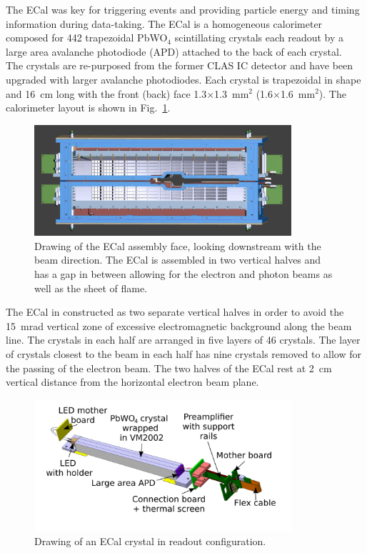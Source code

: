 The ECal was key for triggering events and providing particle energy and timing information during data-taking. The ECal is a homogeneous calorimeter composed for 442 trapezoidal PbWO$_4$ scintillating crystals each readout by a large area avalanche photodiode (APD) attached to the back of each crystal.~\cite{Balossino201789} The crystals are re-purposed from the former CLAS IC detector and have been upgraded with larger avalanche photodiodes. Each crystal is trapezoidal in shape and 16~cm long with the front (back) face 1.3$\times$1.3~mm$^2$ (1.6$\times$1.6~mm$^2$). The calorimeter layout is shown in Fig.~\ref{Figure:ecalface}. 

\begin{figure}[thb]
  \centering
      \includegraphics[width=0.85\textwidth]{pics/experiment/ecalface.png}
  \caption[Drawing of the ECal assembly face]{Drawing of the ECal assembly face, looking downstream with the beam direction. The ECal is assembled in two vertical halves and has a gap in between allowing for the electron and photon beams as well as the sheet of flame.}
  \label{Figure:ecalface}
\end{figure}

The ECal in constructed as two separate vertical halves in order to avoid the 15~mrad vertical zone of excessive electromagnetic background along the beam line. The crystals in each half are arranged in five layers of 46 crystals. The layer of crystals closest to the beam in each half has nine crystals removed to allow for the passing of the electron beam. The two halves of the ECal rest at 2~cm vertical distance from the  horizontal electron beam plane.

\begin{figure}[thb]
  \centering
      \includegraphics[width=0.85\textwidth]{pics/experiment/crystal.png}
  \caption[Single ECal module]{Drawing of an ECal crystal in readout configuration.}
  \label{Figure:crystal}
\end{figure}

